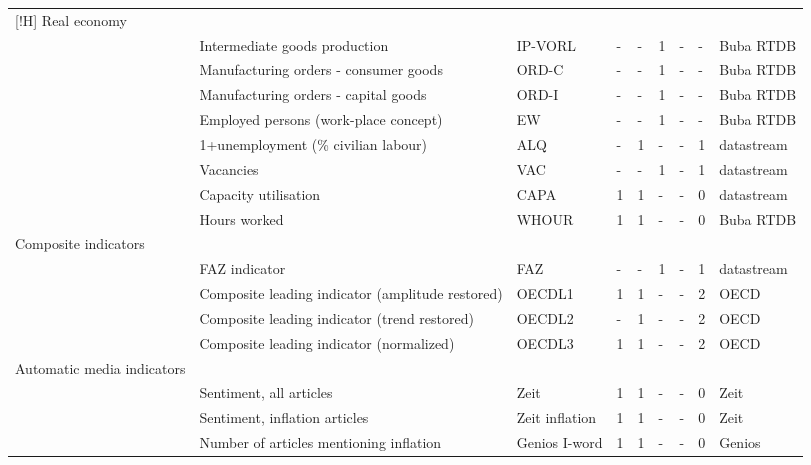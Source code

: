 \documentclass[10pt]{article}
\begin{document}
\begin{footnotesize}
\begin{longtable}{p{1.1in}|p{2.5in}|p{1in}|p{.1in}|p{.1in}|p{.1in}|p{.15in}|p{.1in}|p{.5in}}[!H]
{\tiny{}Real economy} &  &  &  &  &  &  &  & \tabularnewline
 & {\tiny{}Intermediate goods production} & {\tiny{}IP-VORL} & {\tiny{}-} & {\tiny{}-} & {\tiny{}1} & {\tiny{}-} & {\tiny{}-} & {\tiny{}Buba RTDB}\tabularnewline
 & {\tiny{}Manufacturing orders - consumer goods} & {\tiny{}ORD-C} & {\tiny{}-} & {\tiny{}-} & {\tiny{}1} & {\tiny{}-} & {\tiny{}-} & {\tiny{}Buba RTDB}\tabularnewline
 & {\tiny{}Manufacturing orders - capital goods} & {\tiny{}ORD-I} & {\tiny{}-} & {\tiny{}-} & {\tiny{}1} & {\tiny{}-} & {\tiny{}-} & {\tiny{}Buba RTDB}\tabularnewline
 & {\tiny{}Employed persons (work-place concept)} & {\tiny{}EW} & {\tiny{}-} & {\tiny{}-} & {\tiny{}1} & {\tiny{}-} & {\tiny{}-} & {\tiny{}Buba RTDB}\tabularnewline
 & {\tiny{}1+unemployment (\% civilian labour)} & {\tiny{}ALQ} & {\tiny{}-} & {\tiny{}1} & {\tiny{}-} & {\tiny{}-} & {\tiny{}1} & {\tiny{}datastream}\tabularnewline
 & {\tiny{}Vacancies} & {\tiny{}VAC} & {\tiny{}-} & {\tiny{}-} & {\tiny{}1} & {\tiny{}-} & {\tiny{}1} & {\tiny{}datastream}\tabularnewline
 & {\tiny{}Capacity utilisation} & {\tiny{}CAPA} & {\tiny{}1} & {\tiny{}1} & {\tiny{}-} & {\tiny{}-} & {\tiny{}0} & {\tiny{}datastream}\tabularnewline
 & {\tiny{}Hours worked} & {\tiny{}WHOUR} & {\tiny{}1} & {\tiny{}1} & {\tiny{}-} & {\tiny{}-} & {\tiny{}0} & {\tiny{}Buba RTDB}\tabularnewline
{\tiny{}Composite indicators} &  &  &  &  &  &  &  & \tabularnewline
 & {\tiny{}FAZ indicator} & {\tiny{}FAZ} & {\tiny{}-} & {\tiny{}-} & {\tiny{}1} & {\tiny{}-} & {\tiny{}1} & {\tiny{}datastream}\tabularnewline
 & {\tiny{}Composite leading indicator (amplitude restored)} & {\tiny{}OECDL1} & {\tiny{}1} & {\tiny{}1} & {\tiny{}-} & {\tiny{}-} & {\tiny{}2} & {\tiny{}OECD}\tabularnewline
 & {\tiny{}Composite leading indicator (trend restored)} & {\tiny{}OECDL2} & {\tiny{}-} & {\tiny{}1} & {\tiny{}-} & {\tiny{}-} & {\tiny{}2} & {\tiny{}OECD}\tabularnewline
 & {\tiny{}Composite leading indicator (normalized)} & {\tiny{}OECDL3} & {\tiny{}1} & {\tiny{}1} & {\tiny{}-} & {\tiny{}-} & {\tiny{}2} & {\tiny{}OECD}\tabularnewline
{\tiny{}Automatic media indicators} &  &  &  &  &  &  &  & \tabularnewline
 & {\tiny{}Sentiment, all articles} & {\tiny{}Zeit} & {\tiny{}1} & {\tiny{}1} & {\tiny{}-} & {\tiny{}-} & {\tiny{}0} & {\tiny{}Zeit}\tabularnewline
 & {\tiny{}Sentiment, inflation articles} & {\tiny{}Zeit inflation} & {\tiny{}1} & {\tiny{}1} & {\tiny{}-} & {\tiny{}-} & {\tiny{}0} & {\tiny{}Zeit}\tabularnewline
 & {\tiny{}Number of articles mentioning inflation} & {\tiny{}Genios I-word} & {\tiny{}1} & {\tiny{}1} & {\tiny{}-} & {\tiny{}-} & {\tiny{}0} & {\tiny{}Genios}\tabularnewline

\end{longtable}
\end{footnotesize}
\end{document}
